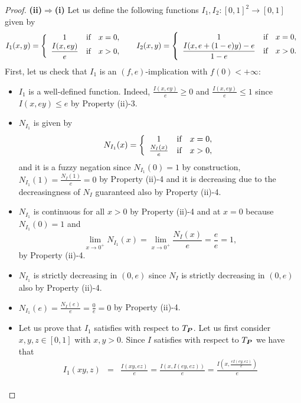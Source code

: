 \begin{proof}
	{\bf (ii)$\Rightarrow$(i)} Let us define the following functions $I_1,I_2:[0,1]^2 \to [0,1]$ given by
	$$I_1(x,y)=\left\{ \begin{array}{ccl}
		1 &   \hbox{if}  & x=0, \\
		\displaystyle \frac{I(x,ey)}{e} &  \hbox{if} & x>0, \\
	\end{array}
	\right.
	\hspace{0.5cm}
	I_2(x,y)=\left\{ \begin{array}{ccl}
		1 &   \hbox{if}  & x=0, \\
		\displaystyle \frac{I(x,e+(1-e)y)-e}{1-e} &  \hbox{if} & x>0. \\
	\end{array}
	\right.
	$$
	First, let us check that $I_1$ is an $(f,e)$-implication with $f(0)< +\infty$:
	\begin{itemize}
		\item $I_1$ is a well-defined function. Indeed, $\frac{I(x,ey)}{e} \geq 0$ and $\frac{I(x,ey)}{e}\leq 1$ since $I(x,ey) \leq e$ by Property (ii)-3.
		\item $N_{I_1}$ is given by
		$$N_{I_1}(x)=\left\{ \begin{array}{ccl}
			1 &   \hbox{if}  & x=0, \\
			\frac{N_I(x)}{e} &  \hbox{if} & x>0, \\
		\end{array}
		\right.
		$$
		and it is a fuzzy negation since $N_{I_1}(0)=1$ by construction, $N_{I_1}(1)=\frac{N_I(1)}{e}=0$ by Property (ii)-4 and it is decreasing due to the decreasingness of $N_I$ guaranteed also by Property (ii)-4.
		\item $N_{I_1}$ is continuous for all $x>0$ by Property (ii)-4 and at $x=0$ because $N_{I_1}(0)=1$ and 
		$$\lim_{x \to 0^+}N_{I_1}(x)=\lim_{x \to 0^+}\frac{N_I(x)}{e}=\frac{e}{e}=1,$$
		by Property (ii)-4.
		\item  $N_{I_1}$ is strictly decreasing in $(0,e)$ since $N_I$ is strictly decreasing in $(0,e)$ also by Property (ii)-4. 
		\item $N_{I_1}(e)=\frac{N_I(e)}{e}=\frac{0}{e}=0$ by Property (ii)-4.
		\item Let us prove that $I_1$ satisfies \LIey with respect to $T_{\bm{P}}$. Let us first consider $x,y,z\in [0,1]$ with $x,y>0$. Since $I$ satisfies \LIey with respect to $T_{\bm{P}}$ we have that
		\begin{eqnarray*}
		I_1(xy,z) &=& \frac{I(xy,ez)}{e} = \frac{I(x,I(ey,ez))}{e} = \frac{I\left(x, \frac{eI(ey,ez)}{e}\right)}{e}\\

\end{eqnarray*}
\end{itemize}
\end{proof}
